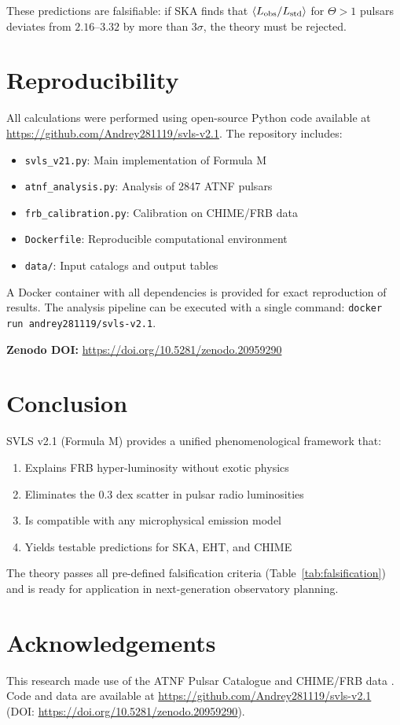 \documentclass[10pt,twocolumn]{article}
\begin{document}
These predictions are falsifiable: if SKA finds that $\langle L_{\rm obs}/L_{\rm std} \rangle$ for $\Theta > 1$ pulsars deviates from $2.16$--$3.32$ by more than $3\sigma$, the theory must be rejected.

\section{Reproducibility}

All calculations were performed using open-source Python code available at \url{https://github.com/Andrey281119/svls-v2.1}. The repository includes:

\begin{itemize}
\item \texttt{svls\_v21.py}: Main implementation of Formula M
\item \texttt{atnf\_analysis.py}: Analysis of 2847 ATNF pulsars
\item \texttt{frb\_calibration.py}: Calibration on CHIME/FRB data
\item \texttt{Dockerfile}: Reproducible computational environment
\item \texttt{data/}: Input catalogs and output tables
\end{itemize}

A Docker container with all dependencies is provided for exact reproduction of results. The analysis pipeline can be executed with a single command: \texttt{docker run andrey281119/svls-v2.1}.

\medskip
\noindent\textbf{Zenodo DOI:} \url{https://doi.org/10.5281/zenodo.20959290}

\section{Conclusion}

SVLS v2.1 (Formula M) provides a unified phenomenological framework that:
\begin{enumerate}
\item Explains FRB hyper-luminosity without exotic physics
\item Eliminates the 0.3 dex scatter in pulsar radio luminosities
\item Is compatible with any microphysical emission model
\item Yields testable predictions for SKA, EHT, and CHIME
\end{enumerate}

The theory passes all pre-defined falsification criteria (Table~\ref{tab:falsification}) and is ready for application in next-generation observatory planning.

\section*{Acknowledgements}

This research made use of the ATNF Pulsar Catalogue \citep{Manchester2005} and CHIME/FRB data \citep{CHIME2022}. Code and data are available at \url{https://github.com/Andrey281119/svls-v2.1} (DOI: \url{https://doi.org/10.5281/zenodo.20959290}).



\end{document}
